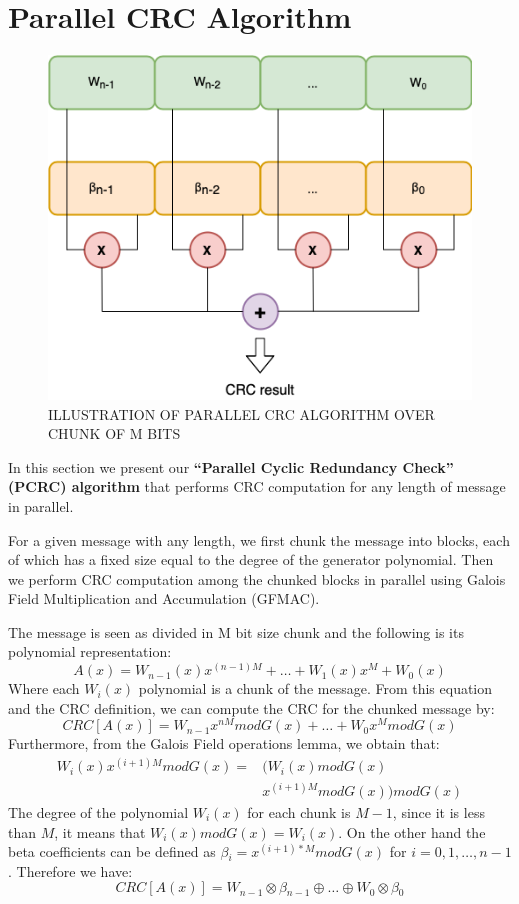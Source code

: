 \documentclass[fleqn]{IEEEtran}
\begin{document}
\section{Parallel CRC Algorithm}
\begin{figure}[bt]
   \centering
   \includegraphics[width=\columnwidth]{figures/PCRC.png}
   \caption{ILLUSTRATION OF  PARALLEL CRC ALGORITHM OVER CHUNK OF M BITS}
   \label{fig:PCRC}
\end{figure}

In this section we present our \textbf{“Parallel Cyclic Redundancy Check” (PCRC) 
algorithm} that performs CRC computation for any length of message in parallel. 

For a given message with any length, we first chunk the message into blocks, 
each of which has a fixed size equal to the degree of the generator polynomial. 
Then we perform CRC computation among the chunked blocks in parallel using 
Galois Field Multiplication and Accumulation (GFMAC).

The message is seen as divided in M bit size chunk and the following is its 
polynomial representation:
\[
   A(x)=W_{n-1}(x)x^{(n-1)M}+\dots{}+W_{1}(x)x^{M}+W_{0}(x)
\]
Where each $W_{i}(x)$ polynomial is a chunk of the message. From this equation 
and the CRC definition, we can compute the CRC for the chunked message by:
\[
   CRC[A(x)]=W_{n-1}x^{nM}modG(x)+\dots{}+W_{0}x^{M}modG(x)
\]
Furthermore, from the Galois Field operations lemma, we obtain that:
\[
\begin{split}
W_{i}(x)x^{(i+1)M}modG(x) = & (W_{i}(x)modG(x) \\& x^{(i+1)M}modG(x))modG(x)
\end{split}
\]
The degree of the polynomial $W_{i}(x)$ for each chunk is $M-1$, since it 
is less than $M$, it means that $W_{i}(x)modG(x)=W_{i}(x)$. On the other hand 
the beta coefficients can be defined as 
$\beta{}_{i}=x^{(i+1)*M}modG(x)$ for $i=0,1,\dots{},n-1$. Therefore we have:
\[
   CRC[A(x)]=W_{n-1}\otimes{}\beta{}_{n-1}\oplus{}\dots{}
   \oplus{}W_{0}\otimes{}\beta{}_{0}
\]
\end{document}
